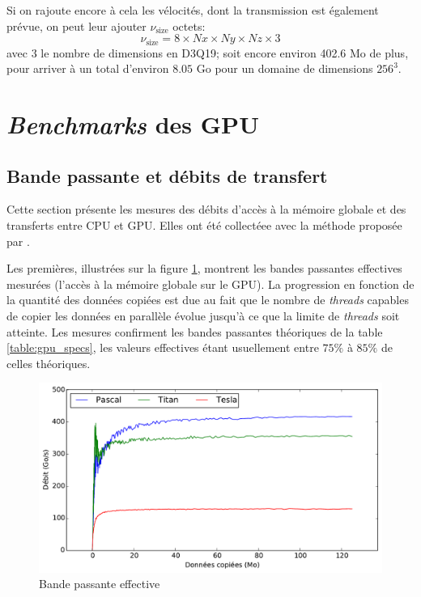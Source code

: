 Si on rajoute encore à cela les vélocités, dont la transmission est également prévue, on peut leur ajouter $\nu_\mathrm{size}$ octets:
\begin{equation}
\nu_\mathrm{size} = 8 \times Nx \times Ny \times Nz \times 3
\end{equation}
avec $3$ le nombre de dimensions en D3Q19; soit encore environ 402.6 Mo de plus, pour arriver à un total d'environ $8.05$ Go pour un domaine de dimensions $256^3$.

\section{\textit{Benchmarks} des \acs{GPU}} \label{title-benchmark_gpu}

\subsection{Bande passante et débits de transfert}
Cette section présente les mesures des débits d'accès à la mémoire globale et des transferts entre \acs{CPU} et \acs{GPU}. Elles ont été collectéee avec la méthode proposée par \citet{noauthor_how_2012}.

Les premières, illustrées sur la figure \ref{fig:bandwidth}, montrent les bandes passantes effectives mesurées (l'accès à la mémoire globale sur le \acs{GPU}). La progression en fonction de la quantité des données copiées est due au fait que le nombre de \textit{threads} capables de copier les données en parallèle évolue jusqu'à ce que la limite de \textit{threads} soit atteinte. Les mesures confirment les bandes passantes théoriques de la table \ref{table:gpu_specs}, les valeurs effectives étant usuellement entre $75\%$ à $85\%$ de celles théoriques.

\begin{figure}[h]
	\centering
	\includegraphics[fbox, scale=0.61]{images/perfs/throughput/bandwidth.pdf}
	\caption{Bande passante effective}
	\label{fig:bandwidth}
\end{figure}

